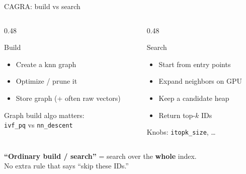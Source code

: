 \documentclass[aspectratio=169,11pt]{beamer}
\begin{document}
\begin{frame}{CAGRA: build vs search}
  \begin{columns}[T]
    \begin{column}{0.48\textwidth}
      \begin{block}{Build}
        \begin{itemize}
          \item Create a knn graph
          \item Optimize / prune it
          \item Store graph (+ often raw vectors)
        \end{itemize}
        {\footnotesize Graph build algo matters:\\
        \texttt{ivf\_pq} vs \texttt{nn\_descent}}
      \end{block}
    \end{column}
    \begin{column}{0.48\textwidth}
      \begin{block}{Search}
        \begin{itemize}
          \item Start from entry points
          \item Expand neighbors on GPU
          \item Keep a candidate heap
          \item Return top-$k$ IDs
        \end{itemize}
        {\footnotesize Knobs: \texttt{itopk\_size}, \ldots}
      \end{block}
    \end{column}
  \end{columns}

  \vspace{0.8em}
  \textbf{``Ordinary build / search''} = search over the \textbf{whole} index.\\
  No extra rule that says ``skip these IDs.''
\end{frame}
\end{document}
